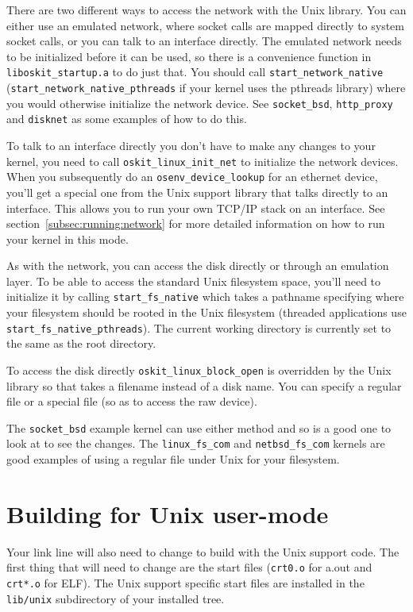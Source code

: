 There are two different ways to access the network with the Unix
library.  You can either use an emulated network, where socket calls
are mapped directly to system socket calls, or you can talk to an
interface directly.  The emulated network needs to be initialized
before it can be used, so there is a convenience function in
{\tt liboskit_startup.a} to do just that.  You should call
{\tt start_network_native} ({\tt start_network_native_pthreads} if your
kernel uses the pthreads library) where you would otherwise initialize
the network device.  See {\tt socket_bsd}, {\tt http_proxy} and
{\tt disknet} as some examples of how to do this.  

To talk to an interface directly you don't have to make any changes to
your \oskit{} kernel, you need to call {\tt oskit_linux_init_net} to
initialize the network devices.  When you subsequently do an
{\tt osenv_device_lookup} for an ethernet device, you'll get a special one
from the Unix support library that talks directly to an interface.  This
allows you to run your own TCP/IP stack on an interface.  See
section~\ref{subsec:running:network} for more detailed information on
how to run your \oskit{} kernel in this mode.  

As with the network, you can access the disk directly or through an
emulation layer.  To be able to access the standard Unix filesystem
space, you'll need to initialize it by calling {\tt start_fs_native}
which takes a pathname specifying where your \oskit{} filesystem should
be rooted in the Unix filesystem (threaded applications use
{\tt start_fs_native_pthreads}).  The current working directory is
currently set to the same as the root directory.

To access the disk directly {\tt oskit_linux_block_open} is
overridden by the Unix library so that takes a filename instead of a
disk name.  You can specify a regular file or a special file (so as to
access the raw device). 

The {\tt socket_bsd} example kernel can use either method and so is a
good one to look at to see the changes.  The {\tt linux_fs_com} and
{\tt netbsd_fs_com} kernels are good examples of using a regular file under
Unix for your filesystem.


\section{Building for Unix user-mode}

Your link line will also need to change to build with the Unix support
code.  The first thing that will need to change are the start files
({\tt crt0.o} for a.out and {\tt crt*.o} for ELF).  The
Unix support specific start files are installed in the {\tt lib/unix}
subdirectory of your installed \oskit{} tree.

